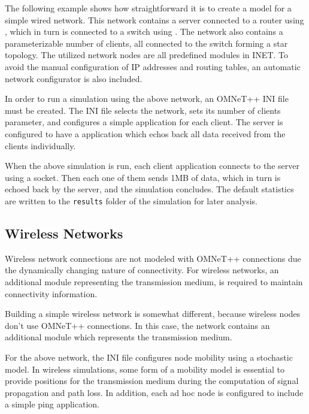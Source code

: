 The following example shows how straightforward it is to create a model for
a simple wired network. This network contains a server connected to a router
using , which in turn is connected to a switch using
. The network also contains a parameterizable number of
clients, all connected to the switch forming a star topology. The utilized
network nodes are all predefined modules in INET. To avoid the manual
configuration of IP addresses and routing tables, an automatic network
configurator is also included.


In order to run a simulation using the above network, an OMNeT++ INI file must
be created. The INI file selects the network, sets its number of clients
parameter, and configures a simple  application for each
client. The server is configured to have a  application which
echos back all data received from the clients individually.


When the above simulation is run, each client application connects to the
server using a  socket. Then each one of them sends 1MB of
data, which in turn is echoed back by the server, and the simulation
concludes. The default statistics are written to the \texttt{results}
folder of the simulation for later analysis.

\subsection{Wireless Networks}


Wireless network connections are not modeled with OMNeT++ connections due the
dynamically changing nature of connectivity. For wireless networks, an
additional module representing the transmission medium, is required to
maintain connectivity information.

Building a simple wireless network is somewhat different, because wireless
nodes don't use OMNeT++ connections. In this case, the network contains an
additional module which represents the transmission medium.


For the above network, the INI file configures node mobility using a
stochastic model. In wireless simulations, some form of a mobility model is
essential to provide positions for the transmission medium during the
computation of signal propagation and path loss. In addition, each ad hoc
node is configured to include a simple ping application.

